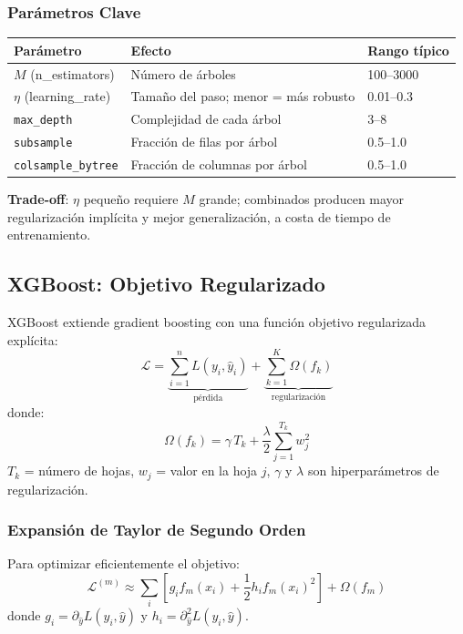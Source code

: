 \documentclass[12pt, a4paper]{article}
\begin{document}
\subsubsection{Parámetros Clave}

\begin{center}
	\begin{tabular}{lll}
		\toprule
		\textbf{Parámetro}         & \textbf{Efecto}                      & \textbf{Rango típico} \\
		\midrule
		$M$ (n\_estimators)        & Número de árboles                    & 100–3000              \\
		$\eta$ (learning\_rate)    & Tamaño del paso; menor = más robusto & 0.01–0.3              \\
		\texttt{max\_depth}        & Complejidad de cada árbol            & 3–8                   \\
		\texttt{subsample}         & Fracción de filas por árbol          & 0.5–1.0               \\
		\texttt{colsample\_bytree} & Fracción de columnas por árbol       & 0.5–1.0               \\
		\bottomrule
	\end{tabular}
\end{center}

\begin{notebox}
	\textbf{Trade-off}: $\eta$ pequeño requiere $M$ grande; combinados producen mayor
	regularización implícita y mejor generalización, a costa de tiempo de entrenamiento.
\end{notebox}

\subsection{XGBoost: Objetivo Regularizado}

XGBoost extiende gradient boosting con una función objetivo regularizada explícita:
\[
	\mathcal{L} = \underbrace{\sum_{i=1}^n L(y_i, \hat{y}_i)}_{\text{pérdida}} +
	\underbrace{\sum_{k=1}^K \Omega(f_k)}_{\text{regularización}}
\]
donde:
\[
	\Omega(f_k) = \gamma\, T_k + \frac{\lambda}{2}\sum_{j=1}^{T_k} w_j^2
\]
$T_k$ = número de hojas, $w_j$ = valor en la hoja $j$, $\gamma$ y $\lambda$ son
hiperparámetros de regularización.

\subsubsection{Expansión de Taylor de Segundo Orden}
Para optimizar eficientemente el objetivo:
\[
	\mathcal{L}^{(m)} \approx \sum_i \left[
		g_i f_m(x_i) + \frac{1}{2} h_i f_m(x_i)^2
		\right] + \Omega(f_m)
\]
donde $g_i = \partial_{\hat{y}} L(y_i, \hat{y})$ y $h_i = \partial^2_{\hat{y}} L(y_i, \hat{y})$.
\end{document}
